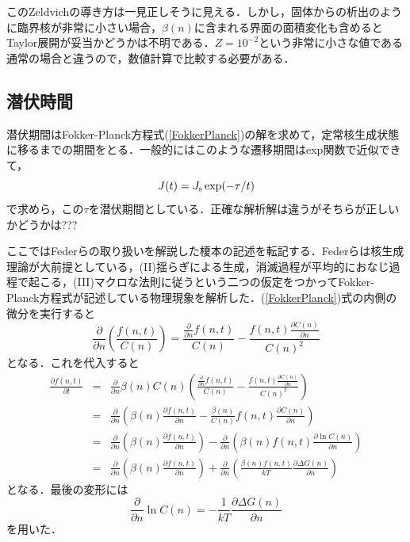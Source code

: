 \documentclass[a4j,10pt]{jarticle}
\begin{document}
このZeldvichの導き方は一見正しそうに見える．しかし，固体からの析出のように臨界核が非常に小さい場合，$\beta(n)$に含まれる界面の面積変化も含めるとTaylor展開が妥当かどうかは不明である．$Z=10^{-2}$という非常に小さな値である通常の場合と違うので，数値計算で比較する必要がある．

\subsection{潜伏時間}
潜伏期間はFokker-Planck方程式(\ref{FokkerPlanck})の解を求めて，定常核生成状態に移るまでの期間をとる．一般的にはこのような遷移期間はexp関数で近似できて，
\begin{equation}
J(t) = J_{\rm s} \exp(-\tau/t)
\end{equation}
で求めら，この$\tau$を潜伏期間としている．正確な解析解は違うがそちらが正しいかどうかは???

ここではFederらの取り扱いを解説した榎本の記述を転記する．Federらは核生成理論が大前提としている，(II)揺らぎによる生成，消滅過程が平均的におなじ過程で起こる，(III)マクロな法則に従うという二つの仮定をつかってFokker-Planck方程式が記述している物理現象を解析した．(\ref{FokkerPlanck})式の内側の微分を実行すると
\begin{equation}
\frac {\partial}{\partial n}\left(\frac{f(n,t)}{C(n)}\right) =
\frac{\frac{\partial}{\partial n}f(n,t)}{C(n)}-
\frac{f(n,t) \frac{\partial C(n)}{\partial n}}{ C(n)^{2}}
\end{equation}
となる．これを代入すると
\begin{eqnarray}
\frac{\partial f(n,t)}{\partial t}
&=&\frac{\partial}{\partial n}\beta(n) C(n)\left(
\frac{\frac{\partial}{\partial n}f(n,t)}{C(n)}-
\frac{f(n,t) \frac{\partial C(n)}{\partial n}}{ C(n)^{2}}
\right) \nonumber \\
&=&\frac{\partial}{\partial n}
\left( \beta(n) \frac{\partial f (n,t)}{\partial n} - 
\frac{\beta(n)}{C(n)} f(n,t) \frac{\partial C(n)}{\partial n}
\right) \nonumber \\
&=&\frac{\partial}{\partial n}
\left( \beta(n) \frac{\partial f (n,t)}{\partial n} \right)
-\frac{\partial}{\partial n}
\left( \beta(n) f (n,t) \frac{\partial \ln C(n)}{\partial n} \right)
 \nonumber \\
&=&\frac{\partial}{\partial n}
\left( \beta(n) \frac{\partial f (n,t)}{\partial n} \right)
+ \frac{\partial}{\partial n}
\left( \frac{\beta(n) f (n,t)}{kT} \frac{\partial \Delta G(n)}{\partial n} \right)
\end{eqnarray}
となる．最後の変形には
\begin{equation}
\frac{\partial}{\partial n} \ln C(n) =
-\frac{1}{kT} \frac{\partial \Delta G(n)}{\partial n}
\end{equation}
を用いた．
\end{document}
